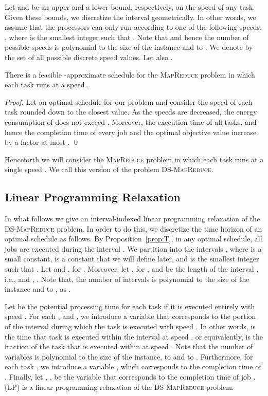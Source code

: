\documentclass{llncs}
\newcommand{\mr}{\textsc{MapReduce}\xspace}
\newcommand{\dmr}{\textsc{DS-MapReduce}\xspace}
\begin{document}
Let  and  be
an upper and a lower bound, respectively, on the speed of any task.
Given these bounds, we discretize the interval  geometrically.
In other words, we assume that the processors can only run according to one of the following speeds:
,
where  is the smallest integer such that .
Note that  and hence the number of possible speeds is polynomial to the size of the instance and to .
We denote by  the set of all possible discrete speed values.
Let also .

\begin{lemma}\label{le:discretespeeds}
There is a feasible -approximate schedule for the \mr problem in which each task  runs at a speed .
\end{lemma}
\begin{proof}
Let an optimal schedule for our problem and consider the speed of each task 
rounded down to the closest  value.
As the speeds are decreased, the energy consumption of  does not exceed .
Moreover, the execution time of all tasks, and hence the completion time of every job
and the optimal objective value increase by a factor at most . \qed
\end{proof}

Henceforth we will consider the \mr problem in which each task  runs at a single speed .
We call this version of the problem \dmr.

\subsection{Linear Programming Relaxation}\label{se:lp}

In what follows we give an interval-indexed linear programming relaxation of the \dmr problem.
In order to do this, we discretize the time horizon of an optimal schedule as follows.
By Proposition~\ref{prop:T}, in any optimal schedule, all jobs are executed during the interval .
We partition  into the intervals
,
where  is a small constant,  is a constant that we will define later,
and  is the smallest integer such that .
Let  and , for .
Moreover, let , for , and
 be the length of the interval , i.e.,  and , .
Note that, the number of intervals is polynomial to the size of the instance and to , as .

Let  be the potential processing time for each task 
if it is executed entirely with speed .
For each ,  and ,
we introduce a variable  that corresponds to the portion of the interval  during which the task  is executed with speed .
In other words,  is the time that task  is executed within the interval  at speed ,
or equivalently,  is the fraction of the task  that is executed within  at speed .
Note that the number of  variables is polynomial to the size of the instance, to  and to .
Furthermore, for each task , we introduce a variable , which corresponds to the completion time of .
Finally, let , , be the variable that corresponds to the completion time of job .
(LP) is a linear programming relaxation of the \dmr problem.
\begin{figure}

\end{figure}
\end{document}
